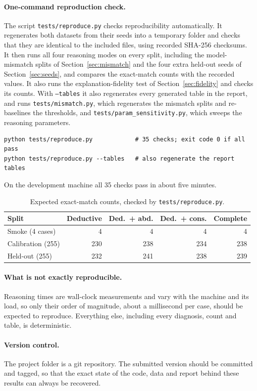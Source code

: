 \paragraph{One-command reproduction check.} The script \texttt{tests/reproduce.py} checks reproducibility automatically. It regenerates both datasets from their seeds into a temporary folder and checks that they are identical to the included files, using recorded SHA-256 checksums. It then runs all four reasoning modes on every split, including the model-mismatch splits of Section~\ref{sec:mismatch} and the four extra held-out seeds of Section~\ref{sec:seeds}, and compares the exact-match counts with the recorded values. It also runs the explanation-fidelity test of Section~\ref{sec:fidelity} and checks its counts. With \texttt{--tables} it also regenerates every generated table in the report, and runs \texttt{tests/mismatch.py}, which regenerates the mismatch splits and re-baselines the thresholds, and \texttt{tests/param\_sensitivity.py}, which sweeps the reasoning parameters.
\begin{lstlisting}[language={}]
python tests/reproduce.py            # 35 checks; exit code 0 if all pass
python tests/reproduce.py --tables   # also regenerate the report tables
\end{lstlisting}
On the development machine all 35 checks pass in about five minutes.

\begin{table}[htbp]
  \centering
  \small
  \caption{Expected exact-match counts, checked by \texttt{tests/reproduce.py}.}
  \label{tab:expected}
  \begin{tabular}{L{3.0cm}rrrr}
    \toprule
    Split & Deductive & Ded.\ + abd. & Ded.\ + cons. & Complete \\
    \midrule
    Smoke (4 cases) & 4 & 4 & 4 & 4 \\
    Calibration (255) & 230 & 238 & 234 & 238 \\
    Held-out (255) & 232 & 241 & 238 & 239 \\
    \bottomrule
  \end{tabular}
\end{table}

\paragraph{What is not exactly reproducible.} Reasoning times are wall-clock measurements and vary with the machine and its load, so only their order of magnitude, about a millisecond per case, should be expected to reproduce. Everything else, including every diagnosis, count and table, is deterministic.

\paragraph{Version control.} The project folder is a git repository. The submitted version should be committed and tagged, so that the exact state of the code, data and report behind these results can always be recovered.
